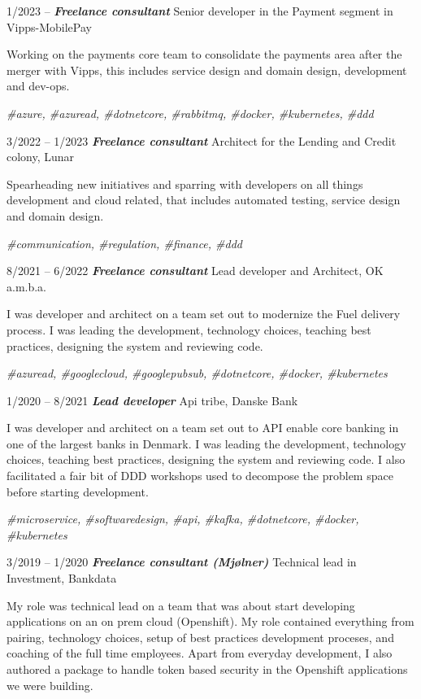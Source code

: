\documentclass[10pt,a4,sans]{article}
\begin{document}
\begin{CV}
    \item[1/2023 -- ] \textbf{\emph{Freelance consultant}} Senior developer in the Payment segment in Vipps-MobilePay

Working on the payments core team to consolidate the payments area after the merger with Vipps, this includes service design and domain design, development and dev-ops.

\emph{\#azure, \#azuread, \#dotnetcore, \#rabbitmq, \#docker, \#kubernetes, \#ddd}

    \item[3/2022 -- 1/2023] \textbf{\emph{Freelance consultant}} Architect for the Lending and Credit colony, Lunar

Spearheading new initiatives and sparring with developers on all things development and cloud related, that includes automated testing, service design and domain design.

\emph{\#communication, \#regulation, \#finance, \#ddd}

    \item[8/2021 -- 6/2022] \textbf{\emph{Freelance consultant}} Lead developer and Architect, OK a.m.b.a.

I was developer and architect on a team set out to modernize the Fuel delivery process. I was leading the development, technology choices, teaching best practices, designing the system and reviewing code.

\emph{\#azuread, \#googlecloud, \#googlepubsub, \#dotnetcore, \#docker, \#kubernetes}

    \item[1/2020 -- 8/2021] \textbf{\emph{Lead developer}} Api tribe, Danske Bank

I was developer and architect on a team set out to API enable core banking in one of the largest banks in Denmark. I was leading the development, technology choices, teaching best practices, designing the system and reviewing code. I also facilitated a fair bit of DDD workshops used to decompose the problem space before starting development.

\emph{\#microservice, \#softwaredesign, \#api, \#kafka, \#dotnetcore, \#docker, \#kubernetes}

    \item[3/2019 -- 1/2020] \textbf{\emph{Freelance consultant (Mjølner)}} Technical lead in Investment, Bankdata
    
My role was technical lead on a team that was about start developing applications on an on prem cloud (Openshift). My role contained everything from pairing, technology choices, setup of best practices development proceses, and coaching of the full time employees. Apart from everyday development, I also authored a package to handle token based security in the Openshift applications we were building.


\end{CV}
\end{document}
